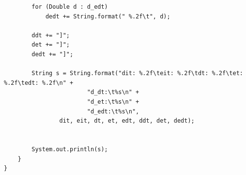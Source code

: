 \documentclass[a4paper]{article}
\begin{document}
\begin{appendix}
\begin{lstlisting}
        for (Double d : d_edt)
            dedt += String.format(" %.2f\t", d);

        ddt += "]";
        det += "]";
        dedt += "]";

        String s = String.format("dit: %.2f\teit: %.2f\tdt: %.2f\tet: %.2f\tedt: %.2f\n" +
                        "d_dt:\t%s\n" +
                        "d_et:\t%s\n" +
                        "d_edt:\t%s\n",
                dit, eit, dt, et, edt, ddt, det, dedt);


        System.out.println(s);
    }
}
\end{lstlisting}


\end{appendix}
\end{document}
